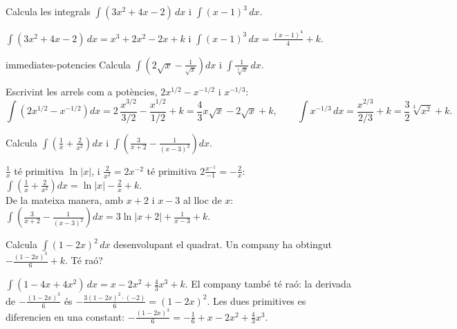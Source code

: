\begin{apartats}

Calcula les integrals $\displaystyle\int(3x^2+4x-2)\,dx$ i $\displaystyle\int(x-1)^3\,dx$.

\begin{solucio}
$\displaystyle\int(3x^2+4x-2)\,dx=x^3+2x^2-2x+k$ i $\displaystyle\int(x-1)^3\,dx=\frac{(x-1)^4}{4}+k$.
\end{solucio}

\begin{tria}{immediates-potencies}
Calcula $\displaystyle\int\left(2\sqrt x-\frac{1}{\sqrt x}\right)dx$ i
$\displaystyle\int\frac{1}{\sqrt[3]x}\,dx$.

\begin{solucio}
Escrivint les arrels com a potències, $2x^{1/2}-x^{-1/2}$ i $x^{-1/3}$:
\[
\int\left(2x^{1/2}-x^{-1/2}\right)dx=2\,\frac{x^{3/2}}{3/2}-\frac{x^{1/2}}{1/2}+k=\frac43x\sqrt x-2\sqrt x+k,
\qquad
\int x^{-1/3}\,dx=\frac{x^{2/3}}{2/3}+k=\frac32\sqrt[3]{x^2}+k.
\]
\end{solucio}

Calcula $\displaystyle\int\left(\frac1x+\frac2{x^2}\right)dx$ i
$\displaystyle\int\left(\frac{3}{x+2}-\frac{1}{(x-3)^2}\right)dx$.

\begin{solucio}
$\frac1x$ té primitiva $\ln|x|$, i $\frac2{x^2}=2x^{-2}$ té primitiva $2\frac{x^{-1}}{-1}=-\frac2x$:
$\displaystyle\int\left(\frac1x+\frac2{x^2}\right)dx=\ln|x|-\frac2x+k$.\\
De la mateixa manera, amb $x+2$ i $x-3$ al lloc de $x$:
$\displaystyle\int\left(\frac{3}{x+2}-\frac{1}{(x-3)^2}\right)dx=3\ln|x+2|+\frac{1}{x-3}+k$.
\end{solucio}
\end{tria}

\begin{nomesllarg}
Calcula $\displaystyle\int(1-2x)^2\,dx$ desenvolupant el quadrat. Un company ha obtingut
$-\frac{(1-2x)^3}{6}+k$. Té raó?

\begin{solucio}
$\displaystyle\int(1-4x+4x^2)\,dx=x-2x^2+\frac43x^3+k$. El company també té raó: la derivada de
$-\frac{(1-2x)^3}{6}$ és $-\frac{3(1-2x)^2\cdot(-2)}{6}=(1-2x)^2$. Les dues primitives es diferencien en
una constant: $-\frac{(1-2x)^3}{6}=-\frac16+x-2x^2+\frac43x^3$.
\end{solucio}
\end{nomesllarg}

\end{apartats}
